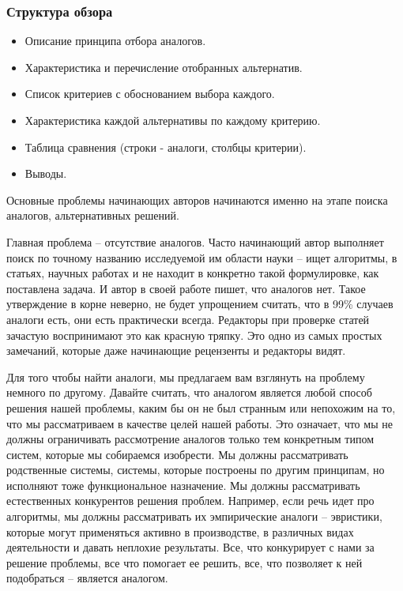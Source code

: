 \documentclass{report}
\begin{document}
\subsubsection{Структура обзора}
\begin{itemize}
	\item Описание принципа отбора аналогов.
	\item Характеристика и перечисление отобранных альтернатив.
	\item Список критериев с обоснованием выбора каждого.
	\item Характеристика каждой альтернативы по каждому критерию.
	\item Таблица сравнения (строки - аналоги, столбцы критерии).
	\item Выводы.
\end{itemize}

Основные проблемы начинающих авторов начинаются именно на этапе поиска аналогов, альтернативных решений.

Главная проблема – отсутствие аналогов. Часто начинающий автор выполняет поиск по точному названию исследуемой им области науки – ищет алгоритмы, в статьях, научных работах и не находит в конкретно такой формулировке, как поставлена задача. И автор в своей работе пишет, что аналогов нет. Такое утверждение в корне неверно, не будет упрощением считать, что в 99\% случаев аналоги есть, они есть практически всегда. Редакторы при проверке статей зачастую воспринимают это как красную тряпку. Это одно из самых простых замечаний, которые даже начинающие рецензенты и редакторы видят.

Для того чтобы найти аналоги, мы предлагаем вам взглянуть на проблему немного по другому. Давайте считать, что аналогом является любой способ решения нашей проблемы, каким бы он не был странным или непохожим на то, что мы рассматриваем в качестве целей нашей работы. Это означает, что мы не должны ограничивать рассмотрение аналогов только тем конкретным типом систем, которые мы собираемся изобрести. Мы должны рассматривать родственные системы, системы, которые построены по другим принципам, но исполняют тоже функциональное назначение. Мы должны рассматривать естественных конкурентов решения проблем. Например, если речь идет про алгоритмы, мы должны рассматривать их эмпирические аналоги – эвристики, которые могут применяться активно в производстве, в различных видах деятельности и давать неплохие результаты. Все, что конкурирует с нами за решение проблемы, все что помогает ее решить, все, что позволяет к ней подобраться – является аналогом.
\end{document}
